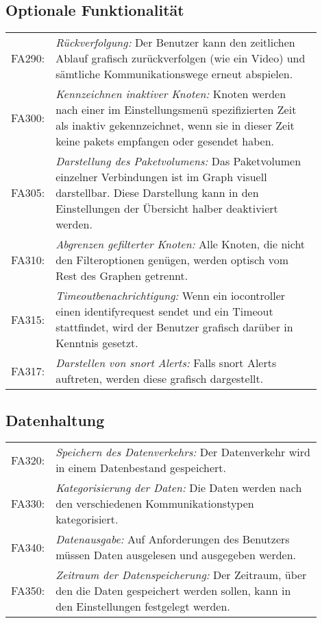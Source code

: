 \subsection{Optionale Funktionalität}
\begin{longtable}{lp{0.9\linewidth}}

FA290: & \textit{Rückverfolgung: }Der Benutzer kann den zeitlichen Ablauf grafisch zurückverfolgen (wie ein Video) und sämtliche Kommunikationswege erneut abspielen. \\

FA300: & \textit{Kennzeichnen inaktiver Knoten: }Knoten werden nach einer im Einstellungsmenü spezifizierten Zeit als inaktiv gekennzeichnet, wenn sie in dieser Zeit keine \glspl{paket} empfangen oder gesendet haben. \\

FA305: & \textit{Darstellung des Paketvolumens: }Das Paketvolumen einzelner Verbindungen ist im Graph visuell darstellbar. Diese Darstellung kann in den Einstellungen der Übersicht halber deaktiviert werden. \\

FA310: & \textit{Abgrenzen gefilterter Knoten: }Alle Knoten, die nicht den Filteroptionen genügen, werden optisch vom Rest des Graphen getrennt. \\

FA315: & \textit{Timeoutbenachrichtigung: }Wenn ein \gls{iocontroller} einen \gls{identifyrequest} sendet und ein Timeout stattfindet, wird der Benutzer grafisch darüber in Kenntnis gesetzt.\\

FA317: & \textit{Darstellen von \gls{snort} Alerts: }Falls \gls{snort} Alerts auftreten, werden diese grafisch dargestellt.

\end{longtable}

\subsection{Datenhaltung}

\begin{longtable}{lp{0.9\linewidth}}

FA320: & \textit{Speichern des Datenverkehrs: }Der Datenverkehr wird in einem Datenbestand gespeichert. \\

FA330: & \textit{Kategorisierung der Daten: }Die Daten werden nach den verschiedenen Kommunikationstypen kategorisiert. \\

FA340: & \textit{Datenausgabe: }Auf Anforderungen des Benutzers müssen Daten ausgelesen und ausgegeben werden. \\

FA350: & \textit{Zeitraum der Datenspeicherung: }Der Zeitraum, über den die Daten gespeichert werden sollen, kann in den Einstellungen festgelegt werden. \\

\end{longtable}

